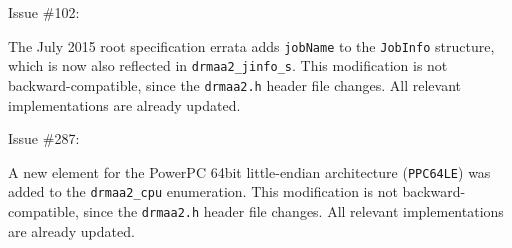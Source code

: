 \documentclass{article}
\newcommand{\h}[1]{\texttt{#1}}
\begin{document}
Issue \#102:

The July 2015 root specification errata adds \h{jobName} to the \h{JobInfo} structure, which is now also reflected in \h{drmaa2\_jinfo\_s}. This modification is not backward-compatible, since the \h{drmaa2.h} header file changes. All relevant implementations are already updated.

Issue \#287:

A new element for the PowerPC 64bit little-endian architecture (\h{PPC64LE}) was added to the \h{drmaa2\_cpu} enumeration. This modification is not backward-compatible, since the \h{drmaa2.h} header file changes. All relevant implementations are already updated.
\end{document}
